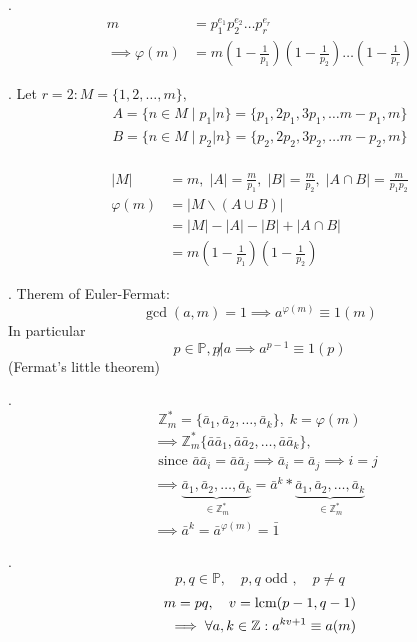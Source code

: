 \Theorem.
\begin{align*}
  m &= p_1^{e_1} p_2^{e_2} \ldots p_r^{e_r} \\
  \implies \varphi(m) &= m \left( 1-\frac{1}{p_1} \right) \left( 1-\frac{1}{p_2} \right) \ldots \left( 1-\frac{1}{p_r} \right)
\end{align*}

\Proof.
Let $r=2: M = \{1,2, \ldots, m\},$ 
\begin{align*}
  A = \{ n \in M \mid p_1|n\} = \{p_1, 2p_1, 3p_1, \ldots m-p_1, m\} \\
  B = \{ n \in M \mid p_2|n\} = \{p_2, 2p_2, 3p_2, \ldots m-p_2, m\} \\
\end{align*}

\begin{align*}
  |M| &= m, \; |A| = \frac{m}{p_1}, \; |B| = \frac{m}{p_2}, \;
    |A \cap B| = \frac{m}{p_1p_2}\\
  \varphi(m) 
    &= | M \backslash(A\cup B) | \\
    &= |M| - |A| - |B| + | A \cap B|\\
    &= m \left(1- \frac{1}{p_1} \right) \left(1- \frac{1}{p_2} \right)
\end{align*}

\Theorem.
Therem of Euler-Fermat:
\[
  \gcd(a,m) = 1 \implies a ^{\varphi(m)} \equiv 1 (m)
\]
In particular 
\[
  p \in \mathbb{P}, p \not| a \implies a^{p-1} \equiv 1 (p)
\]
(Fermat's little theorem)

\Proof.
\[
  \mathbb{Z}_m^{*} = \{\bar{a}_1, \bar{a}_2, \ldots, \bar{a}_k \}, \;k = \varphi(m)
\]
\begin{align*}
  &\implies \mathbb{Z}_m^{*} \{\bar{a}\bar{a}_1, \bar{a}\bar{a}_2, \ldots, \bar{a}\bar{a}_k \}, \\
  &\text{ since } \bar{a}\bar{a}_i = \bar{a}\bar{a}_j
    \implies \bar{a}_i = \bar{a}_j \implies i = j \\
  &\implies \underbrace{\bar{a}_1, \bar{a}_2, \ldots, \bar{a}_k}_
        {\in \mathbb{Z}_m^{*}}
      = \bar{a}^k * \underbrace{\bar{a}_1, \bar{a}_2, \ldots, \bar{a}_k}_
        {\in \mathbb{Z}_m^{*}} \\
  &\implies \bar{a}^k = \bar{a}^{\varphi(m)} = \bar{1} 
\end{align*}

\Theorem.
\[
  p, q \in \mathbb{P}, \quad p,q \text{ odd }, \quad p \neq q
\]
\begin{align*}
  m = pq, \quad v = \operatorname{lcm}(p-1, q-1) \\
  \implies \forall a,k \in \mathbb{Z}: a^{kv + 1} \equiv a(m)
\end{align*}

